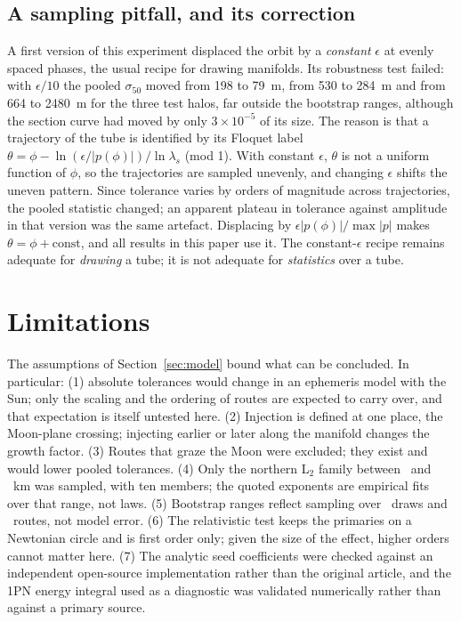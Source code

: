 \documentclass[11pt,a4paper]{article}
\begin{document}
\subsection{A sampling pitfall, and its correction}\label{sec:pitfall}
A first version of this experiment displaced the orbit by a \emph{constant} $\epsilon$ at evenly spaced phases, the usual recipe for drawing
manifolds. Its robustness test failed: with $\epsilon/10$ the pooled $\sigma_{50}$ moved from 198 to 79~m, from 530 to 284~m and from 664 to 2480~m
for the three test halos, far outside the bootstrap ranges, although the section curve had moved by only $3\times10^{-5}$ of its size.
The reason is that a trajectory of the tube is identified by its Floquet label $\theta=\phi-\ln(\epsilon/|p(\phi)|)/\ln\lambda_s$ (mod 1). With constant $\epsilon$,
$\theta$ is not a uniform function of $\phi$, so the trajectories are sampled unevenly, and changing $\epsilon$ shifts the uneven pattern.
Since tolerance varies by orders of magnitude across trajectories, the pooled statistic changed; an apparent plateau in tolerance against
amplitude in that version was the same artefact. Displacing by $\epsilon|p(\phi)|/\max|p|$ makes $\theta=\phi+\text{const}$, and all results in this paper use it.
The constant-$\epsilon$ recipe remains adequate for \emph{drawing} a tube; it is not adequate for \emph{statistics} over a tube.

\section{Limitations}
The assumptions of Section~\ref{sec:model} bound what can be concluded. In particular: (1) absolute tolerances
would change in an ephemeris model with the Sun; only the scaling and the ordering of routes are expected to carry over,
and that expectation is itself untested here. (2) Injection is defined at one place, the Moon-plane crossing; injecting
earlier or later along the manifold changes the growth factor. (3) Routes that graze the Moon were excluded;
they exist and would lower pooled tolerances. (4) Only the northern L$_2$ family between \AzMin\ and \AzMax~km was sampled, with ten members;
the quoted exponents are empirical fits over that range, not laws. (5) Bootstrap ranges reflect sampling over
\NSamples\ draws and \NPhases\ routes, not model error. (6) The relativistic test keeps the primaries on a Newtonian circle
and is first order only; given the size of the effect, higher orders cannot matter here. (7) The analytic seed coefficients were checked
against an independent open-source implementation rather than the original article, and the 1PN energy integral
used as a diagnostic was validated numerically rather than against a primary source.
\end{document}
